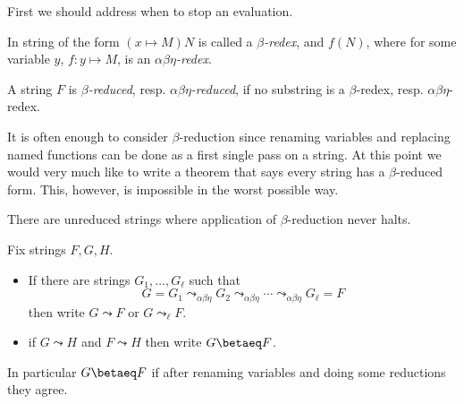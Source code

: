 
First we should address when to stop an evaluation.

\begin{definition}
    In string of the form $(x\mapsto M)N$ is called a 
    \emph{$\beta$-redex}, and $f(N)$, where
    for some variable $y$, $f:y\mapsto M$,
    is an \emph{$\alpha\beta\eta$-redex}.

    A string $F$ is \emph{$\beta$-reduced}, resp.
    \emph{$\alpha\beta\eta$-reduced}, if no substring is 
    a $\beta$-redex, resp. $\alpha\beta\eta$-redex.
\end{definition}
It is often enough to consider $\beta$-reduction since 
renaming variables and replacing named functions can be done 
as a first single pass on a string.  At this point we would 
very much like to write a theorem that says every string 
has a $\beta$-reduced form.  This, however, is impossible 
in the worst possible way.

\begin{theorem}
    There are unreduced strings where application of $\beta$-reduction 
    never halts.
\end{theorem}

\begin{definition}
    Fix strings $F,G,H$.
    \begin{itemize}
        \item If there are strings 
        $G_1,\ldots,G_{\ell}$ such that 
        \[ G=G_1 \leadsto_{\alpha\beta\eta} G_2 \leadsto_{\alpha\beta\eta}
        \cdots\leadsto_{\alpha\beta\eta} G_{\ell}=F\]
        then write $G\leadsto F$ or $G\leadsto_{\ell}F$.

        \item if $G\leadsto H$ and $F\leadsto H$ then write $G\betaeq F$.

    \end{itemize}
    
\end{definition}
In particular $G\betaeq F$ if after renaming variables and doing some reductions 
they agree.

